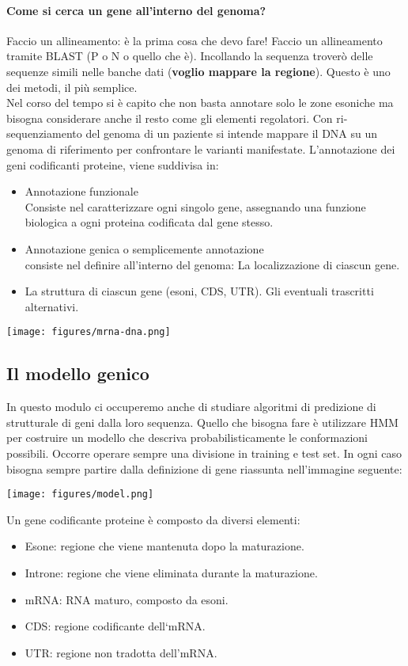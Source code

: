 \documentclass{article}
\begin{document}
\paragraph{Come si cerca un gene all'interno del genoma?}
Faccio un allineamento: è la prima cosa che devo fare! Faccio un allineamento tramite BLAST (P o N o quello che è). Incollando la sequenza troverò delle sequenze simili nelle banche dati (\textbf{voglio mappare la regione}). Questo è uno dei metodi, il più semplice.\\

Nel corso del tempo si è capito che non basta annotare solo le zone esoniche ma bisogna considerare anche il resto come gli elementi regolatori.
Con ri-sequenziamento del genoma di un paziente si intende mappare il DNA su un genoma di riferimento per confrontare le varianti manifestate.
L’annotazione dei geni codificanti proteine, viene suddivisa in:
\begin{itemize}
    \item Annotazione funzionale\\Consiste nel caratterizzare ogni
    singolo gene, assegnando una funzione biologica a ogni proteina
    codificata dal gene stesso.
    \item Annotazione genica o semplicemente annotazione\\ consiste
    nel definire all’interno del genoma:
        \subitem{-} La localizzazione di ciascun gene. \item La struttura di ciascun gene (esoni,
        CDS, UTR).
        \subitem{-} Gli eventuali trascritti alternativi.
\end{itemize}
\begin{center}
    \texttt{[image: figures/mrna-dna.png]}
\end{center}
\subsection{Il modello genico}
In questo modulo ci occuperemo anche di studiare algoritmi di predizione di strutturale di geni dalla loro sequenza. Quello che bisogna fare è utilizzare HMM per costruire un modello che descriva probabilisticamente le conformazioni possibili.
Occorre operare sempre una divisione in training e test set. In ogni caso bisogna sempre partire dalla definizione di gene riassunta nell’immagine seguente:
\begin{center}
    \texttt{[image: figures/model.png]}
\end{center}
Un gene codificante proteine è composto da diversi elementi:
\begin{itemize}
    \item Esone: regione che viene mantenuta dopo la maturazione.
    \item Introne: regione che viene eliminata durante la maturazione.
    \item mRNA: RNA maturo, composto da esoni.
    \item CDS: regione codificante dell‘mRNA.
    \item UTR: regione non tradotta dell’mRNA.
\end{itemize}
\end{document}

